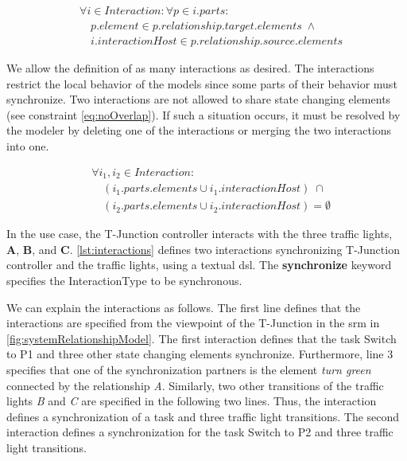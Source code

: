 \documentclass{jot}
\begin{document}
\begin{equation} \label{eq:interactionConstraint}
    \begin{aligned}
    & \forall i \in Interaction: \forall p \in i.parts : \\
    & \quad p.element \in p.relationship.target.elements \; \wedge \\
    & \quad i.interactionHost \in p.relationship.source.elements
    \end{aligned}
\end{equation}

We allow the definition of as many interactions as desired.
The interactions restrict the local behavior of the models since some parts of their behavior must synchronize.
Two interactions are not allowed to share state changing elements (see constraint \eqref{eq:noOverlap}).
If such a situation occurs, it must be resolved by the modeler by deleting one of the interactions or merging the two interactions into one.

\begin{equation} \label{eq:noOverlap}
    \begin{aligned}
    & \forall i_1,i_2 \in Interaction : \\
    & \quad (i_1.parts.elements \cup i_1.interactionHost) \; \cap \\
    & \quad (i_2.parts.elements \cup i_2.interactionHost) = \emptyset
    \end{aligned}
\end{equation}

In the use case, the T-Junction controller interacts with the three traffic lights, \textbf{A}, \textbf{B}, and \textbf{C}.
\autoref{lst:interactions} defines two interactions synchronizing T-Junction controller and the traffic lights, using a textual \gls*{dsl}.
The \textbf{synchronize} keyword specifies the \textsf{InteractionType} to be \textsf{synchronous}.



We can explain the interactions as follows.
The first line defines that the interactions are specified from the viewpoint of the T-Junction in the \gls*{srm} in \cref{fig:systemRelationshipModel}.
The first interaction defines that the task \textsf{Switch to P1} and three other state changing elements synchronize.
Furthermore, line 3 specifies that one of the synchronization partners is the element \textit{turn green} connected by the relationship \textit{A}.
Similarly, two other transitions of the traffic lights \textit{B} and \textit{C} are specified in the following two lines.
Thus, the interaction defines a synchronization of a task and three traffic light transitions. 
The second interaction defines a synchronization for the task \textsf{Switch to P2} and three traffic light transitions.
\end{document}
